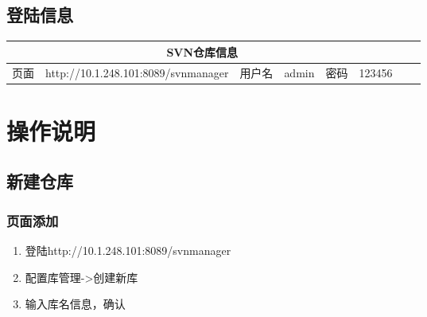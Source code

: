 \documentclass[11pt,a4paper]{article}
\begin{document}
	\subsection {登陆信息}
	\begin{table}[!htp]
	\begin{center}
	\begin{tabular}{|c|c|c|c|c|c|c|c|c|c|c|c|c|}
	\hline
	\multicolumn{11}{|c|}{SVN仓库信息} \\
	\hline
	\multicolumn{2}{|c|}{页面} & 
	\multicolumn{5}{c|}{http://10.1.248.101:8089/svnmanager}  &
	{用户名} & {admin} &
	{密码} & {123456} \\
	\hline
	\end{tabular}
	\end{center}
	\end{table}
	

	\section{操作说明}
	\subsection {新建仓库}
	\subsubsection {页面添加} 
		\begin{enumerate}[step 1]
		\item 登陆http://10.1.248.101:8089/svnmanager
		\item 配置库管理->创建新库
		\item 输入库名信息，确认
		\end{enumerate}
\end{document}
